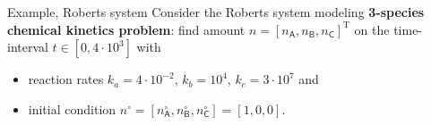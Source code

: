 \begin{frame}{Example, Roberts system}
	\vskip 10pt
	\small 
		Consider the Roberts system modeling  \alert{\bf 3-species chemical kinetics problem}: 
		find amount $n = [n_{\mathsf{A}}, n_{\mathsf{B}}, n_{\mathsf{C}}]^{\mathrm{T}}$ 
		on the time-interval $t \in [0, 4 \cdot 10^{3}]$ with
		\begin{itemize}
			\item reaction rates $k_a = 4 \cdot10^{-2}$, $k_b = 10^{4}$, $k_c = 3\cdot10^{7}$ and 
			\item initial condition $n^\circ = [n_\mathsf{A}^{\circ}, n_\mathsf{B}^{\circ}, n_\mathsf{C}^{\circ}]=[1, 0, 0]$.
		\end{itemize}
		\vskip -10pt
		

\end{frame}
